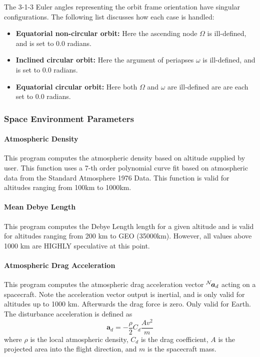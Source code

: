 The 3-1-3 Euler angles representing the orbit frame orientation have singular configurations.  The following list discusses how each case is handled:
\begin{itemize}
	\item {\bfseries Equatorial non-circular orbit:} Here the ascending node $\Omega$ is ill-defined, and is  set to 0.0 radians.  
	\item {\bfseries Inclined circular orbit:}  Here the argument of periapses $\omega$ is ill-defined, and is set to 0.0 radians.
	\item {\bfseries Equatorial circular orbit:} Here both $\Omega$ and $\omega$ are ill-defined are are each set to 0.0 radians.
\end{itemize}















\subsubsection{Space Environment Parameters}
\paragraph{Atmospheric Density}
This program computes the atmospheric density based on altitude  supplied by user.  This function uses a 7-th order polynomial curve fit based on  atmospheric data from the Standard Atmosphere 1976 Data. This function is valid for altitudes ranging from 100km to 1000km.

\paragraph{Mean Debye Length}
This program computes the Debye Length length for a given  altitude and is valid for altitudes ranging  from 200 km to GEO (35000km).  However, all values above   1000 km are HIGHLY speculative at this point.

\paragraph{Atmospheric Drag Acceleration}
This program computes the atmospheric drag acceleration   vector $\leftexp{N}{\bm a}_{d}$ acting on a spacecraft.   Note the acceleration vector output is inertial, and is   only valid for altitudes up to 1000 km.   Afterwards the drag force is zero. Only valid for Earth.  The disturbance acceleration is defined as
\begin{equation}
	\bm a_{d} = -\frac{\rho}{2} C_{d} \frac{A v^{2}}{m}
\end{equation}
where $\rho$ is the local atmospheric density, $C_{d}$ is the drag coefficient, $A$ is the projected area into the flight direction, and $m$ is the spacecraft mass.


